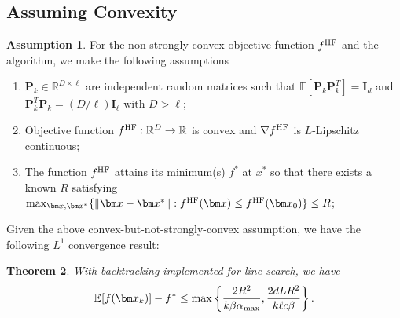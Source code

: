 \documentclass[10pt]{article} %
\numberwithin{equation}{section}
\theoremstyle{plain}
\newtheorem{theorem}{Theorem} \numberwithin{theorem}{section}
\theoremstyle{definition}
\newtheorem{assumption}[theorem]{Assumption}
\newcommand{\<}{\langle}
\renewcommand{\>}{\rangle}
\renewcommand{\(}{\left(}
\renewcommand{\)}{\right)}
\renewcommand{\[}{\left[}
\renewcommand{\]}{\right]}
\def\R{{\mathbb R}}
\def\R{{\mathbb R}}
\newcommand{\HF}{\textup{HF}}
\newcommand{\alphaMax}{\alpha_\textup{max}}
\newcommand{\Lip}{L}
\begin{document}
\subsection{Assuming Convexity}
\begin{assumption}
\label{asp:ssd2}
For the non-strongly convex objective function $f^\HF$ and the algorithm, we make the following assumptions
\begin{enumerate}
    \item $\bm P_k\in\R^{D\times\ell}$ are independent random matrices such that $\mathbb{E}[\bm P_k\bm P_k^T] = \bm I_d$ and $\bm P_k^T\bm P_k = (D/\ell)\bm I_\ell$ with $D>\ell$;
    \item Objective function $f^\HF:\R^D\to\R$ is convex and $\nabla f^\HF$ is $\Lip$-Lipschitz continuous;
    \item The function $f^\HF$ attains its minimum(s) $f^*$ at $x^*$ so that there exists a known $R$ satisfying $\max_{\bm x,\bm x^*}\{\lVert\bm x - \bm x^*\rVert:f^\HF(\bm x)\leq f^\HF(\bm x_0)\}\leq R$;
\end{enumerate}
\end{assumption}
Given the above convex-but-not-strongly-convex assumption, we have the following $L^1$ convergence result:
\begin{theorem}
\label{thm:sf-c}
With backtracking implemented for line search, we have
\begin{equation}
\mathbb{E}[f(\bm x_k)] - f^* \leq \max\left\{\frac{2R^2}{k\beta \alphaMax}, \frac{2d\Lip R^2}{k\ell c\beta}\right\}.
\end{equation}
\end{theorem}
\end{document}

